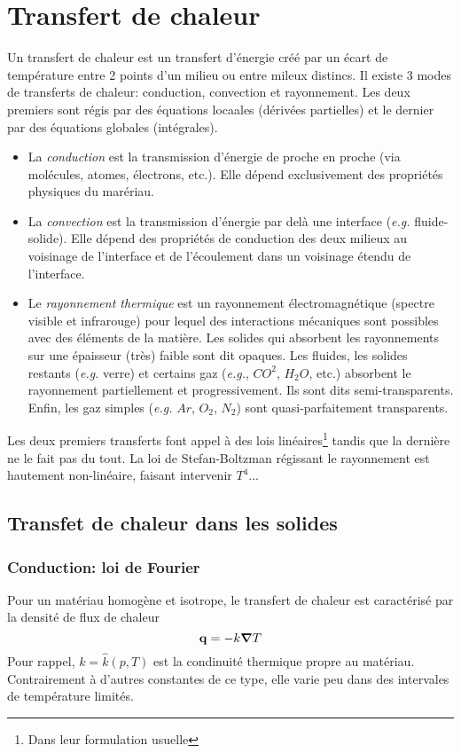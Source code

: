 
\chapter{Transfert de chaleur}
  Un transfert de chaleur est un transfert d'énergie créé par un écart de température entre 2 points d'un milieu ou entre mileux distincs. Il existe 3 modes de transferts de chaleur: conduction, convection et rayonnement. Les deux premiers sont régis par des équations locaales (dérivées partielles) et le dernier par des équations globales (intégrales).
  \begin{itemize}
    \item La \textit{conduction} est la transmission d'énergie de proche en proche (via molécules, atomes, électrons, etc.). Elle dépend exclusivement des propriétés physiques du marériau.
    \item La \textit{convection} est la transmission d'énergie par delà une interface (\textit{e.g.} fluide-solide). Elle dépend des propriétés de conduction des deux milieux au voisinage de l'interface et de l'écoulement dans un voisinage étendu de l'interface.
    \item Le \textit{rayonnement thermique} est un rayonnement électromagnétique (spectre visible et infrarouge) pour lequel des interactions mécaniques sont possibles avec des éléments de la matière. Les solides qui absorbent les rayonnements sur une épaisseur (très) faible sont dit opaques. Les fluides, les solides restants (\textit{e.g.} verre) et certains gaz (\textit{e.g.}, $CO^2$, $H_2O$, etc.) absorbent le rayonnement partiellement et progressivement. Ils sont dits semi-transparents. Enfin, les gaz simples (\textit{e.g.} $Ar$, $O_2$, $N_2$) sont quasi-parfaitement transparents.
  \end{itemize}

  Les deux premiers transferts font appel à des lois linéaires\footnote{Dans leur formulation usuelle} tandis que la dernière ne le fait pas du tout. La loi de Stefan-Boltzman régissant le rayonnement est hautement non-linéaire, faisant intervenir $T^4$...

  \section{Transfet de chaleur dans les solides}
    \subsection{Conduction: loi de Fourier}
      Pour un matériau homogène et isotrope, le transfert de chaleur est caractérisé par la densité de flux de chaleur
      \begin{equation}
        \vb{q} = - k \grad T
      \end{equation}
      Pour rappel, $k = \hat{k}(p, T)$ est la condinuité thermique propre au matériau. Contrairement à d'autres constantes de ce type, elle varie peu dans des intervales de température limités.

